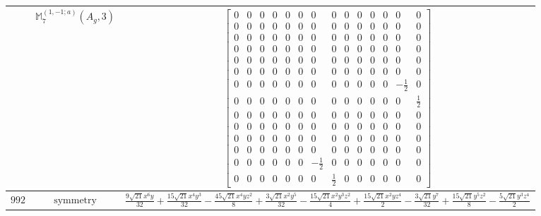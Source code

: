 \documentclass[fleqn,8pt,landscape]{jsarticle}
\begin{document}
\begin{longtable}{ccc}
$  $ & $ \mathbb{M}_{7}^{(1,-1;a)}(A_{g},3) $ & $ \begin{bmatrix} 0 & 0 & 0 & 0 & 0 & 0 & 0 & 0 & 0 & 0 & 0 & 0 & 0 & 0 \\ 0 & 0 & 0 & 0 & 0 & 0 & 0 & 0 & 0 & 0 & 0 & 0 & 0 & 0 \\ 0 & 0 & 0 & 0 & 0 & 0 & 0 & 0 & 0 & 0 & 0 & 0 & 0 & 0 \\ 0 & 0 & 0 & 0 & 0 & 0 & 0 & 0 & 0 & 0 & 0 & 0 & 0 & 0 \\ 0 & 0 & 0 & 0 & 0 & 0 & 0 & 0 & 0 & 0 & 0 & 0 & 0 & 0 \\ 0 & 0 & 0 & 0 & 0 & 0 & 0 & 0 & 0 & 0 & 0 & 0 & 0 & 0 \\ 0 & 0 & 0 & 0 & 0 & 0 & 0 & 0 & 0 & 0 & 0 & 0 & - \frac{1}{2} & 0 \\ 0 & 0 & 0 & 0 & 0 & 0 & 0 & 0 & 0 & 0 & 0 & 0 & 0 & \frac{1}{2} \\ 0 & 0 & 0 & 0 & 0 & 0 & 0 & 0 & 0 & 0 & 0 & 0 & 0 & 0 \\ 0 & 0 & 0 & 0 & 0 & 0 & 0 & 0 & 0 & 0 & 0 & 0 & 0 & 0 \\ 0 & 0 & 0 & 0 & 0 & 0 & 0 & 0 & 0 & 0 & 0 & 0 & 0 & 0 \\ 0 & 0 & 0 & 0 & 0 & 0 & 0 & 0 & 0 & 0 & 0 & 0 & 0 & 0 \\ 0 & 0 & 0 & 0 & 0 & 0 & - \frac{1}{2} & 0 & 0 & 0 & 0 & 0 & 0 & 0 \\ 0 & 0 & 0 & 0 & 0 & 0 & 0 & \frac{1}{2} & 0 & 0 & 0 & 0 & 0 & 0 \end{bmatrix} $ \\ \hline
$ 992 $ & $ \text{symmetry} $ & $ \frac{9 \sqrt{21} x^{6} y}{32} + \frac{15 \sqrt{21} x^{4} y^{3}}{32} - \frac{45 \sqrt{21} x^{4} y z^{2}}{8} + \frac{3 \sqrt{21} x^{2} y^{5}}{32} - \frac{15 \sqrt{21} x^{2} y^{3} z^{2}}{4} + \frac{15 \sqrt{21} x^{2} y z^{4}}{2} - \frac{3 \sqrt{21} y^{7}}{32} + \frac{15 \sqrt{21} y^{5} z^{2}}{8} - \frac{5 \sqrt{21} y^{3} z^{4}}{2} $ \\

\end{longtable}
\end{document}
